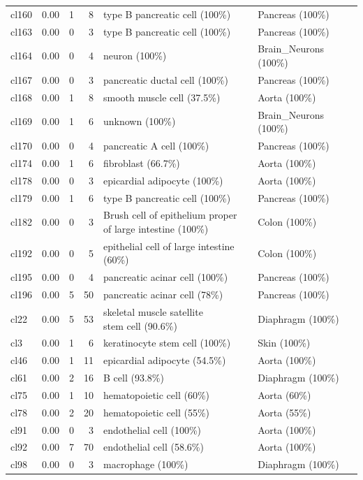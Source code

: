 \begin{table}[ht!]
\begin{tabular}{lrrrll}
  cl160 & 0.00 &   1 &   8 & type B pancreatic cell (100\%) & Pancreas (100\%) \\ 
  cl163 & 0.00 &   0 &   3 & type B pancreatic cell (100\%) & Pancreas (100\%) \\ 
  cl164 & 0.00 &   0 &   4 & neuron (100\%) & Brain\_Neurons (100\%) \\ 
  cl167 & 0.00 &   0 &   3 & pancreatic ductal cell (100\%) & Pancreas (100\%) \\ 
  cl168 & 0.00 &   1 &   8 & smooth muscle cell (37.5\%) & Aorta (100\%) \\ 
  cl169 & 0.00 &   1 &   6 & unknown (100\%) & Brain\_Neurons (100\%) \\ 
  cl170 & 0.00 &   0 &   4 & pancreatic A cell (100\%) & Pancreas (100\%) \\ 
  cl174 & 0.00 &   1 &   6 & fibroblast (66.7\%) & Aorta (100\%) \\ 
  cl178 & 0.00 &   0 &   3 & epicardial adipocyte (100\%) & Aorta (100\%) \\
  cl179 & 0.00 &   1 &   6 & type B pancreatic cell (100\%) & Pancreas (100\%) \\ 
  cl182 & 0.00 &   0 &   3 & \specialcell[t]{Brush cell of epithelium proper\\of large intestine (100\%)} & Colon (100\%) \\ 
  cl192 & 0.00 &   0 &   5 & epithelial cell of large intestine (60\%) & Colon (100\%) \\ 
  cl195 & 0.00 &   0 &   4 & pancreatic acinar cell (100\%) & Pancreas (100\%) \\ 
  cl196 & 0.00 &   5 &  50 & pancreatic acinar cell (78\%) & Pancreas (100\%) \\ 
  cl22 & 0.00 &   5 &  53 & \specialcell[t]{skeletal muscle satellite\\stem cell (90.6\%)} & Diaphragm (100\%) \\ 
  cl3 & 0.00 &   1 &   6 & keratinocyte stem cell (100\%) & Skin (100\%) \\ 
  cl46 & 0.00 &   1 &  11 & epicardial adipocyte (54.5\%) & Aorta (100\%) \\ 
  cl61 & 0.00 &   2 &  16 & B cell (93.8\%) & Diaphragm (100\%) \\ 
  cl75 & 0.00 &   1 &  10 & hematopoietic cell (60\%) & Aorta (60\%) \\ 
  cl78 & 0.00 &   2 &  20 & hematopoietic cell (55\%) & Aorta (55\%) \\ 
  cl91 & 0.00 &   0 &   3 & endothelial cell (100\%) & Aorta (100\%) \\ 
  cl92 & 0.00 &   7 &  70 & endothelial cell (58.6\%) & Aorta (100\%) \\ 
  cl98 & 0.00 &   0 &   3 & macrophage (100\%) & Diaphragm (100\%) \\ 
   \bottomrule
\end{tabular}
\end{table}


